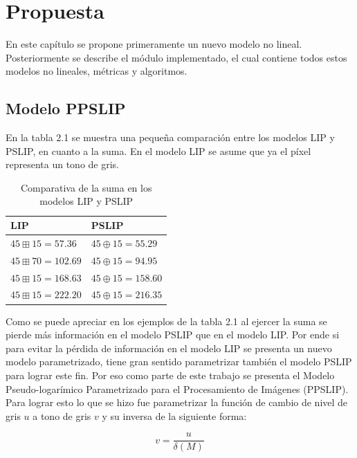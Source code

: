 \chapter{Propuesta}\label{chapter:proposal}

En este cap\'itulo se propone primeramente un nuevo modelo no lineal. Posteriormente se describe el m\'odulo implementado, el cual contiene todos estos modelos no lineales, m\'etricas y algoritmos.

\section{Modelo PPSLIP}

En la tabla 2.1 se muestra una peque\~na comparaci\'on entre los modelos LIP y PSLIP, en cuanto a la suma. En el modelo LIP se asume que ya el p\'ixel representa un tono de gris.

\begin{table}
	\caption{Comparativa de la suma en los modelos LIP y PSLIP}
	\begin{center}
		\begin{tabular}{|l|l|}
			\hline 
			\textbf{LIP} & \textbf{PSLIP}\\
			\hline
			$45 \boxplus 15 = 57.36$ & $45 \oplus 15 = 55.29$\\
			\hline
			$45 \boxplus 70 = 102.69$ & $45 \oplus 15 = 94.95$\\
			\hline
			$45 \boxplus 15 = 168.63$ & $45 \oplus 15 = 158.60$\\
			\hline
			$45 \boxplus 15 = 222.20$ & $45 \oplus 15 = 216.35$\\
			\hline
		\end{tabular}
	\end{center}
\end{table}

Como se puede apreciar en los ejemplos de la tabla 2.1 al ejercer la suma se pierde m\'as informaci\'on en el modelo PSLIP que en el modelo LIP. Por ende si para evitar la p\'erdida de informaci\'on en el modelo LIP se presenta un nuevo modelo parametrizado, tiene gran sentido parametrizar tambi\'en el modelo PSLIP para lograr este fin. Por eso como parte de este trabajo se presenta el Modelo Pseudo-logar\'imico Parametrizado para el Procesamiento de Im\'agenes (PPSLIP). Para lograr esto lo que se hizo fue parametrizar la funci\'on de cambio de nivel de gris $u$ a tono de gris $v$ y su inversa de la siguiente forma:

\begin{equation}
	v=\frac{u}{\delta(M)}
\end{equation}

